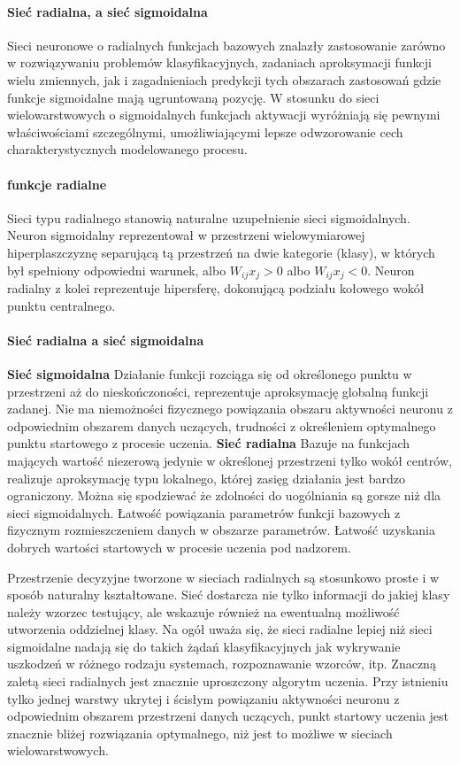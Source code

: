 \paragraph{Sieć radialna, a sieć sigmoidalna}

Sieci neuronowe o radialnych funkcjach bazowych znalazły zastosowanie
zarówno w rozwiązywaniu problemów klasyfikacyjnych, zadaniach
aproksymacji funkcji wielu zmiennych, jak i zagadnieniach predykcji tych
obszarach zastosowań gdzie funkcje sigmoidalne mają ugruntowaną pozycję.
W stosunku do sieci wielowarstwowych o sigmoidalnych funkcjach aktywacji
wyróżniają się pewnymi właściwościami szczególnymi, umożliwiającymi
lepsze odwzorowanie cech charakterystycznych modelowanego procesu.

\paragraph{funkcje radialne}

Sieci typu radialnego stanowią naturalne uzupełnienie sieci sigmoidalnych. 
Neuron sigmoidalny reprezentował w przestrzeni wielowymiarowej 
hiperplaszczyznę separującą tą przestrzeń na dwie kategorie (klasy), w 
których był spełniony odpowiedni warunek, albo 
$W_{ij} x_j > 0$ albo $W_{ij} x_j < 0$. 
Neuron radialny z kolei reprezentuje hipersferę, dokonującą podziału 
kołowego wokół punktu centralnego. 

\paragraph{Sieć radialna a sieć sigmoidalna}
\textbf{Sieć sigmoidalna}
Działanie funkcji rozciąga się od określonego punktu w przestrzeni aż do 
nieskończoności, reprezentuje aproksymację globalną funkcji zadanej. Nie 
ma niemożności fizycznego powiązania obszaru aktywności neuronu z 
odpowiednim obszarem danych uczących, trudności z określeniem 
optymalnego punktu startowego z procesie uczenia.
\textbf{Sieć radialna}
Bazuje na funkcjach mających wartość niezerową jedynie w określonej 
przestrzeni tylko wokół centrów, realizuje aproksymację typu lokalnego, 
której zasięg działania jest bardzo ograniczony. Można się spodziewać że 
zdolności do uogólniania są gorsze niż dla sieci sigmoidalnych. Łatwość
powiązania parametrów funkcji bazowych z fizycznym rozmieszczeniem 
danych w obszarze parametrów. Łatwość uzyskania dobrych wartości 
startowych w procesie uczenia pod nadzorem.

Przestrzenie decyzyjne tworzone w sieciach radialnych są stosunkowo 
proste i w sposób naturalny kształtowane. Sieć dostarcza nie tylko 
informacji do jakiej klasy należy wzorzec testujący, ale wskazuje również
na ewentualną możliwość utworzenia oddzielnej klasy. 
Na ogół uważa się, że sieci radialne lepiej niż sieci sigmoidalne nadają się
do takich żądań klasyfikacyjnych jak wykrywanie uszkodzeń w różnego 
rodzaju systemach, rozpoznawanie wzorców, itp. 
Znaczną zaletą sieci radialnych jest znacznie uproszczony algorytm 
uczenia. Przy istnieniu tylko jednej warstwy ukrytej i ścisłym powiązaniu 
aktywności neuronu z odpowiednim obszarem przestrzeni danych 
uczących, punkt startowy uczenia jest znacznie bliżej rozwiązania 
optymalnego, niż jest to możliwe w sieciach wielowarstwowych.

